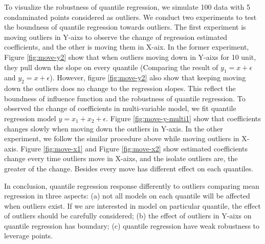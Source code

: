 \documentclass[article]{jss}
\theoremstyle{definition}
\theoremstyle{definition}
\theoremstyle{remark}
\begin{document}
To visualize the robustness of quantile regression, we simulate 100 data
with 5 condaminated points considered as outliers. We conduct two
experiments to test the boundness of quantile regression towards
outliers. The first experiment is moving outliers in Y-aixs to observe
the change of regression estimated coefficients, and the other is moving
them in X-aix. In the former experiment, Figure \ref{fig:move-y2} show
that when outliers moving down in Y-aixs for 10 unit, they pull down the
slope on every quantile (Comparing the result of \(y_{1}=x+\epsilon\)
and \(y_{2}=x+\epsilon\)). However, figure \ref{fig:move-y2} also show
that keeping moving down the outliers does no change to the regression
slopes. This reflect the boundness of influence function and the
robustness of quantile regression. To observed the change of
coefficients in multi-variable model, we fit quantile regression model
\(y=x_{1}+x_{2}+\epsilon\). Figure \ref{fig:move-y-multi1} show that
coefficients changes slowly when moving down the outliers in Y-axis. In
the other experiment, we follow the similar procedure above while moving
outliers in X-axis. Figure \ref{fig:move-x1} and Figure
\ref{fig:move-x2} show estimated coefficients change every time outliers
move in X-aixs, and the isolate outliers are, the greater of the change.
Besides every move has different effect on each quantiles.

In conclusion, quantile regression response differently to outliers
comparing mean regression in three aspects: (a) not all models on each
quantile will be affected when outliers exist. If we are interested in
model on particular quantile, the effect of outliers should be carefully
considered; (b) the effect of outliers in Y-aixs on quantile regression
has boundary; (c) quantile regression have weak robustness to leverage
points.
\end{document}
